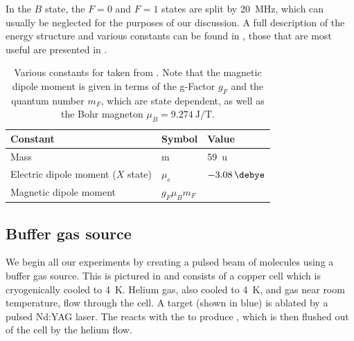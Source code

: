 In the $B$ state, the $F=0$ and $F=1$ states are split by \SI{20}{\mega\hertz},
which can usually be neglected for the purposes of our discussion. A full
description of the \CaF{} energy structure and various constants can be found
in , those that are most useful are presented in
.

\begin{table}
  \centering
\begin{tabular}{lll}
  \hline\hline
  Constant & Symbol & Value \\
  \hline
  Mass & m & \SI{59}{\amu}\\
  Electric dipole moment ($X$ state) & $\mu_e$ & $\SI{-3.08}{\debye}$\\
  Magnetic dipole moment & $g_F\mu_B m_F$ & \\
 \hline
\end{tabular}
\caption[\CaF{} constants]{
  Various constants for \CaF{} taken from . Note that
  the magnetic dipole moment is given in terms of the g-Factor $g_F$ and the
  quantum number $m_F$, which are state dependent, as well as the Bohr magneton
  $\mu_B = \SI{9.274}{\joule\per\tesla}$.
  }
  \label{overview:table:constants}
\end{table}

\subsection{Buffer gas source}

We begin all our experiments by creating a pulsed beam of \CaF{} molecules
using a buffer gas source. This is pictured in 
and consists of a copper cell which is cryogenically cooled to \SI{4}{\kelvin}.
%
Helium gas, also cooled to \SI{4}{\kelvin}, and \SFsix{} gas near room
temperature, flow through the cell. A \Ca{} target (shown in blue) is ablated
by a pulsed Nd:YAG laser. The \Ca{} reacts with the \SFsix{} to produce \CaF{}, which is
then flushed out of the cell by the helium flow.

